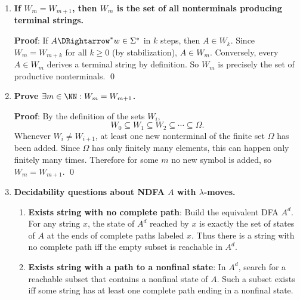 \begin{enumerate}[{12.}1. ]
\begin{enumerate}
\item \textbf{Proof of monotonicity}: $W_0=\emptyset\subseteq W_1$ (trivially). By induction: if $W_k\subseteq W_{k+1}$, then for any $A\in W_{k+1}$: $A$ derives a terminal string in $\leq k+1$ steps, hence in $\leq k+2$ steps as well, so $A\in W_{k+2}$. Thus $W_{k+1}\subseteq W_{k+2}$. The chain is bounded by $\Omega$. \qed
\end{enumerate}

\item \textbf{If $W_m = W_{m+1}$, then $W_m$ is the set of all nonterminals producing terminal strings.}

\textbf{Proof}: If $A\DRightarrow^* w\in\Sigma^*$ in $k$ steps, then $A\in W_k$. Since $W_m=W_{m+k}$ for all $k\geq 0$ (by stabilization), $A\in W_m$. Conversely, every $A\in W_m$ derives a terminal string by definition. So $W_m$ is precisely the set of productive nonterminals. \qed

\item \textbf{Prove $\exists m\in\NN: W_m = W_{m+1}$.}

\textbf{Proof}: By the definition of the sets $W_i$,
\[
W_0\subseteq W_1\subseteq W_2\subseteq\cdots\subseteq\Omega.
\]
Whenever $W_i\neq W_{i+1}$, at least one new nonterminal of the finite set
$\Omega$ has been added. Since $\Omega$ has only finitely many elements, this can
happen only finitely many times. Therefore for some $m$ no new symbol is added,
so $W_m=W_{m+1}$. \qed

\item \textbf{Decidability questions about NDFA $A$ with $\lambda$-moves.}

\begin{enumerate}
\item \textbf{Exists string with no complete path}: Build the equivalent DFA
$A^d$. For any string $x$, the state of $A^d$ reached by $x$ is exactly the set
of states of $A$ at the ends of complete paths labeled $x$. Thus there is a
string with no complete path iff the empty subset is reachable in $A^d$.

\item \textbf{Exists string with a path to a nonfinal state}: In $A^d$, search
for a reachable subset that contains a nonfinal state of $A$. Such a subset
exists iff some string has at least one complete path ending in a nonfinal
state.


\end{enumerate}
\end{enumerate}
